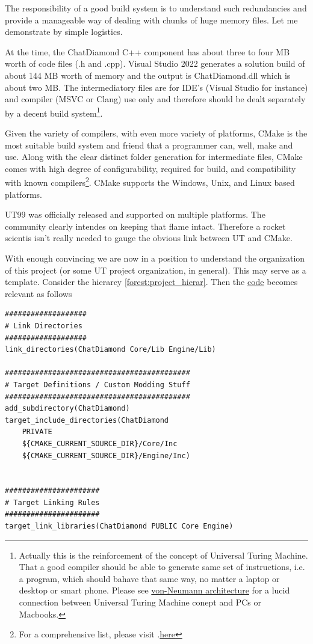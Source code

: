 \documentclass{article}
\theoremstyle{definition}
\newenvironment{dummy}{}{}
\newcommand{\FileColor}[1]{{\color{Purple} #1}}
\begin{document}
The responsibility of a good build system is to understand such redundancies and provide a manageable way of dealing with chunks of huge memory files.
Let me demonstrate by simple logistics.  

At the time, the ChatDiamond C++ component has about three to four MB worth of code files (.h and .cpp).  
Visual Studio 2022 generates a solution build of about 144 MB worth of memory and the output is \FileColor{ChatDiamond.dll} which is about two MB.  The intermediatory files are 
for IDE's (Visual Studio for instance) and compiler (MSVC or Clang) use only and therefore should be dealt separately by a decent build system\footnote{Actually this is the
reinforcement of the concept of Universal Turing Machine.  That a good compiler should be able to generate same set of instructions, i.e. a program, 
which should bahave that same way, no matter a laptop or desktop or smart phone.  Please see \href{https://en.wikipedia.org/wiki/Von_Neumann_architecture}{von-Neumann architecture} for a lucid connection 
between Universal Turing Machine conept and PCs or Macbooks.}.

Given the variety of compilers, with even more variety of platforms, CMake is the most suitable build system and friend that a programmer can, well, make and use.  Along with the clear 
distinct folder generation for intermediate files, CMake comes with high degree of configurability, required for build, and compatibility with known compilers\footnote{For a comprehensive list, please visit .\href{https://cmake.org/cmake/help/latest/manual/cmake-compile-features.7.html}{here}}.  
CMake supports the Windows, Unix, and Linux based platforms.

UT99 was officially released and supported on multiple platforms.  The community clearly intendes on keeping that flame intact.  Therefore a rocket scientis isn't really needed to gauge the obvious link 
between UT and CMake.

With enough convincing we are now in a position to understand the organization of this project (or some UT project organization, in general).  This may serve as a template.  
Consider the hierarcy \ref{forest:project_hierar}.  Then the \href{https://github.com/ravimohan1991/ChatDiamond/blob/f7950b2591b93a54600459ec58d7ddf57fe9218d/UTNativeEssentials/CMakeLists.txt#L201-L216}{code} becomes relevant as follows

\lstset{language=[5.0]Lua}
\begin{dummy}
\begin{lstlisting}[frame=single]
###################
# Link Directories
###################
link_directories(ChatDiamond Core/Lib Engine/Lib)

###########################################
# Target Definitions / Custom Modding Stuff
###########################################
add_subdirectory(ChatDiamond)
target_include_directories(ChatDiamond
    PRIVATE
    ${CMAKE_CURRENT_SOURCE_DIR}/Core/Inc
    ${CMAKE_CURRENT_SOURCE_DIR}/Engine/Inc)


######################
# Target Linking Rules
######################
target_link_libraries(ChatDiamond PUBLIC Core Engine)
\end{lstlisting}
\end{dummy}
\end{document}
